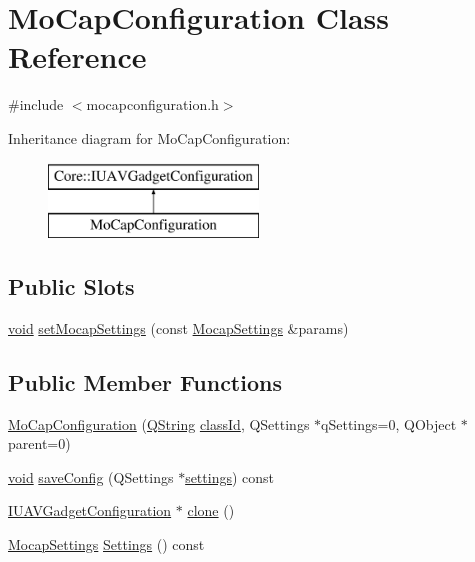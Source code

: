 \hypertarget{class_mo_cap_configuration}{\section{\-Mo\-Cap\-Configuration \-Class \-Reference}
\label{class_mo_cap_configuration}
}


{\ttfamily \#include $<$mocapconfiguration.\-h$>$}

\-Inheritance diagram for \-Mo\-Cap\-Configuration\-:\begin{figure}[H]
\begin{center}
\leavevmode
\includegraphics[height=2.000000cm]{class_mo_cap_configuration}
\end{center}
\end{figure}
\subsection*{\-Public \-Slots}
\begin{DoxyCompactItemize}
\item 
\hyperlink{group___u_a_v_objects_plugin_ga444cf2ff3f0ecbe028adce838d373f5c}{void} \hyperlink{group___mo_cap_plugin_ga1c9c0bbef4c538125abfd27b6fc47208}{set\-Mocap\-Settings} (const \hyperlink{group___mo_cap_plugin_ga6083347a5b3eb70e360f599354dc0f0b}{\-Mocap\-Settings} \&params)
\end{DoxyCompactItemize}
\subsection*{\-Public \-Member \-Functions}
\begin{DoxyCompactItemize}
\item 
\hyperlink{group___mo_cap_plugin_ga98e918c3063a6ec66da51a9532174cc8}{\-Mo\-Cap\-Configuration} (\hyperlink{group___u_a_v_objects_plugin_gab9d252f49c333c94a72f97ce3105a32d}{\-Q\-String} \hyperlink{group___core_plugin_gac953657221ba7fda967ada0408332641}{class\-Id}, \-Q\-Settings $\ast$q\-Settings=0, \-Q\-Object $\ast$parent=0)
\item 
\hyperlink{group___u_a_v_objects_plugin_ga444cf2ff3f0ecbe028adce838d373f5c}{void} \hyperlink{group___mo_cap_plugin_ga4890815d185a0393db178dd686be0bdb}{save\-Config} (\-Q\-Settings $\ast$\hyperlink{group___mo_cap_plugin_ga7211120cc5d6c7feffb594a36552a9af}{settings}) const 
\item 
\hyperlink{group___core_plugin_gacdfdf0b1e39b5002472b76b6564ce51f}{\-I\-U\-A\-V\-Gadget\-Configuration} $\ast$ \hyperlink{group___mo_cap_plugin_gadc51635684ea1cfd6355b0ad8e0b40a6}{clone} ()
\item 
\hyperlink{group___mo_cap_plugin_ga6083347a5b3eb70e360f599354dc0f0b}{\-Mocap\-Settings} \hyperlink{group___mo_cap_plugin_ga27cf83efd45539e4f87288010c5f285a}{\-Settings} () const 
\end{DoxyCompactItemize}
